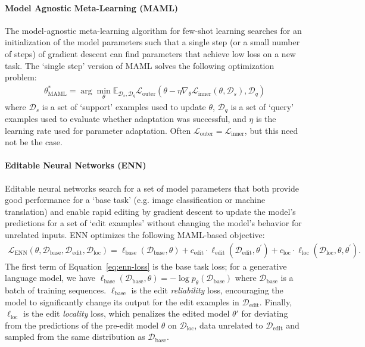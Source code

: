 \documentclass{article}
\begin{document}
\paragraph{Model Agnostic Meta-Learning (MAML)}
The model-agnostic meta-learning algorithm \citep{finn2017maml} for few-shot learning searches for an initialization of the model parameters such that a single step (or a small number of steps) of gradient descent can find parameters that achieve low loss on a new task. The `single step' version of MAML solves the following optimization problem:
\begin{align}
    \theta^*_\text{MAML} = \arg\min_\theta \mathbb{E}_{\mathcal{D}_s,\mathcal{D}_q}\mathcal{L}_\text{outer}(\theta - \eta \nabla_\theta \mathcal{L}_\text{inner}(\theta, \mathcal{D}_s), \mathcal{D}_q)
\end{align}
where $\mathcal{D}_s$ is a set of `support' examples used to update $\theta$, $\mathcal{D}_q$ is a set of `query' examples used to evaluate whether adaptation was successful, and $\eta$ is the learning rate used for parameter adaptation. Often $\mathcal{L}_\text{outer} = \mathcal{L}_\text{inner}$, but this need not be the case.

\paragraph{Editable Neural Networks (ENN)}
\label{sec:enn-prelims}
Editable neural networks \citep{Sinitsin2020Editable} search for a set of model parameters that both provide good performance for a `base task' (e.g. image classification or machine translation) and enable rapid editing by gradient descent to update the model's predictions for a set of `edit examples' without changing the model's behavior for unrelated inputs. ENN optimizes the following MAML-based objective:
\begin{align}
    \mathcal{L}_\text{ENN}(\theta, \mathcal{D}_\text{base}, \mathcal{D}_\text{edit}, \mathcal{D}_\text{loc}) = \ell_\text{base}(\mathcal{D}_\text{base}, \theta) + c_\text{edit}\cdot\ell_\text{edit}(\mathcal{D}_\text{edit}, \theta^\prime) + c_\text{loc}\cdot\ell_\text{loc}(\mathcal{D}_\text{loc}, \theta, \theta^\prime).\label{eq:enn-loss}
\end{align}
The first term of Equation~\ref{eq:enn-loss} is the base task loss; for a generative language model, we have $\ell_\text{base}(\mathcal{D}_\text{base}, \theta) = -\log p_{\theta}(\mathcal{D}_\text{base})$ where $\mathcal{D}_\text{base}$ is a batch of training sequences. $\ell_\text{base}$ is the edit \textit{reliability} loss, encouraging the model to significantly change its output for the edit examples in $\mathcal{D}_\text{edit}$. Finally, $\ell_\text{loc}$ is the edit \textit{locality} loss, which penalizes the edited model $\theta'$ for deviating from the predictions of the pre-edit model $\theta$ on $\mathcal{D}_\text{loc}$, data unrelated to $\mathcal{D}_\text{edit}$ and sampled from the same distribution as $\mathcal{D}_\text{base}$.
\end{document}
